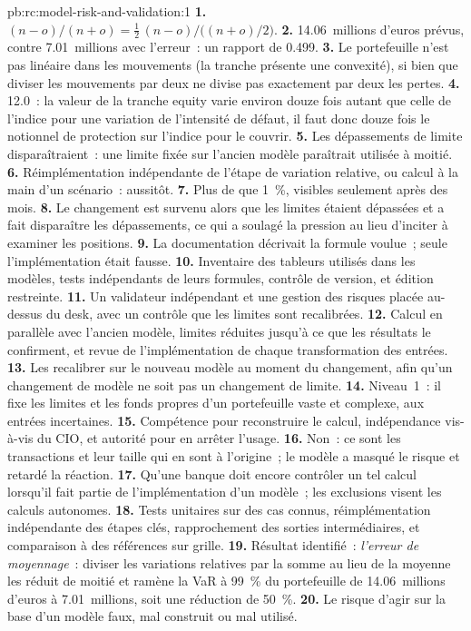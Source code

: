 \begin{solution}{pb:rc:model-risk-and-validation:1}
\textbf{1.} $(n-o)/(n+o) = \tfrac12\,(n-o)/\bigl((n+o)/2\bigr)$.
\textbf{2.} 14.06~millions d'euros prévus, contre 7.01~millions avec l'erreur~: un rapport de 0.499.
\textbf{3.} Le portefeuille n'est pas linéaire dans les mouvements (la tranche présente une convexité), si bien que diviser les mouvements par deux ne
divise pas exactement par deux les pertes.
\textbf{4.} 12.0~: la valeur de la tranche equity varie environ douze fois autant que celle de l'indice pour une variation
de l'intensité de défaut, il faut donc douze fois le notionnel de protection sur l'indice pour le couvrir.
\textbf{5.} Les dépassements de limite disparaîtraient~: une limite fixée sur l'ancien modèle paraîtrait utilisée à moitié.
\textbf{6.} Réimplémentation indépendante de l'étape de variation relative, ou calcul à la main
d'un scénario~: aussitôt.
\textbf{7.} Plus de  que 1~\%, visibles seulement après des mois.
\textbf{8.} Le changement est survenu alors que les limites étaient dépassées et a fait disparaître les dépassements, ce qui a soulagé la pression
au lieu d'inciter à examiner les positions.
\textbf{9.} La documentation décrivait la formule voulue~; seule l'implémentation était fausse.
\textbf{10.} Inventaire des tableurs utilisés dans les modèles, tests indépendants de leurs formules, contrôle de version,
et édition restreinte.
\textbf{11.} Un validateur indépendant et une gestion des risques placée au-dessus du desk, avec un contrôle que les limites sont
recalibrées.
\textbf{12.} Calcul en parallèle avec l'ancien modèle, limites réduites jusqu'à ce que les résultats le confirment, et revue
de l'implémentation de chaque transformation des entrées.
\textbf{13.} Les recalibrer sur le nouveau modèle au moment du changement, afin qu'un changement de modèle ne soit pas un changement de limite.
\textbf{14.} Niveau~1~: il fixe les limites et les fonds propres d'un portefeuille vaste et complexe, aux entrées incertaines.
\textbf{15.} Compétence pour reconstruire le calcul, indépendance vis-à-vis du CIO, et autorité pour en arrêter l'usage.
\textbf{16.} Non~: ce sont les transactions et leur taille qui en sont à l'origine~; le modèle a masqué le risque et retardé la réaction.
\textbf{17.} Qu'une banque doit encore contrôler un tel calcul lorsqu'il fait partie de l'implémentation d'un modèle~;
les exclusions visent les calculs autonomes.
\textbf{18.} Tests unitaires sur des cas connus, réimplémentation indépendante des étapes clés, rapprochement des
sorties intermédiaires, et comparaison à des références sur grille.
\textbf{19.} Résultat identifié~: \emph{l'erreur de moyennage}~: diviser les variations relatives par la somme au lieu de la
moyenne les réduit de moitié et ramène la VaR à 99~\% du portefeuille de 14.06~millions d'euros à 7.01~millions, soit une réduction de 50~\%.
\textbf{20.} Le risque d'agir sur la base d'un modèle faux, mal construit ou mal utilisé.
\end{solution}


